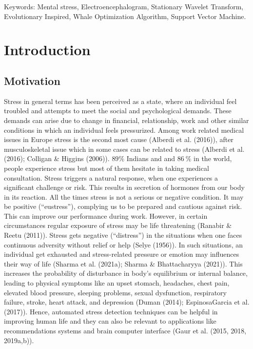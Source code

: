 Keywords: Mental stress, Electroencephalogram, Stationary Wavelet Transform, Evolutionary Inspired, Whale Optimization Algorithm, Support Vector Machine.

\section{Introduction}

\subsection{Motivation}

Stress in general terms has been perceived as a state, where an individual feel troubled and attempts to meet the social and psychological demands. These demands can arise due to change in financial, relationship, work and other similar conditions in which an individual feels pressurized. Among work related medical issues in Europe stress is the second most cause (Alberdi et al. (2016)), after musculoskeletal issue which in some cases can be related to stress (Alberdi et al. (2016); Colligan \& Higgins (2006)). $89\%$ Indians and and $86~\%$ in the world, people experience stress but most of them hesitate in taking medical consultation. Stress triggers a natural response, when one experiences a significant challenge or risk. This results in secretion of hormones from our body in its reaction. All the times stress is not a serious or negative condition. It may be positive (“eustress”), complying us to be prepared and cautious against risk. This can improve our performance during work. However, in certain circumstances regular exposure of stress may be life threatening (Ranabir \& Reetu (2011)). Stress gets negative (“distress”) in the situations when one faces continuous adversity without relief or help (Selye (1956)). In such situations, an individual get exhausted and stress-related pressure or emotion may influences their way of life (Sharma et al. (2021a); Sharma \& Bhattacharyya (2021)). This increases the probability of disturbance in body’s equilibrium or internal balance, leading to physical symptoms like an upset stomach, headaches, chest pain, elevated blood pressure, sleeping problems, sexual dysfunction, respiratory failure, stroke, heart attack, and depression (Duman (2014); EspinosaGarcia et al. (2017)). Hence, automated stress detection techniques can be helpful in improving human life and they can also be relevant to applications like recommendations systems and brain computer interface (Gaur et al. (2015, 2018, 2019a,b)).

